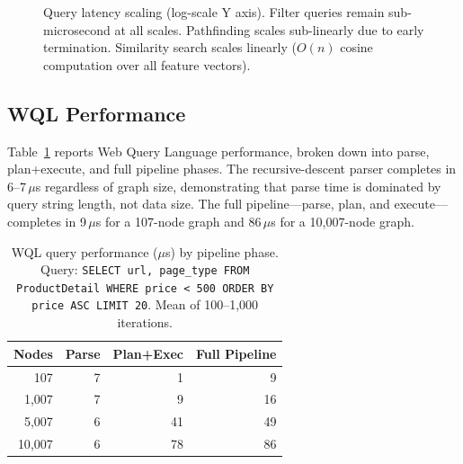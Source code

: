 \documentclass[10pt, twocolumn]{article}
\begin{document}
\begin{figure}[t]
\centering
{}
\caption{Query latency scaling (log-scale Y axis). Filter queries remain sub-microsecond at all scales. Pathfinding scales sub-linearly due to early termination. Similarity search scales linearly ($O(n)$ cosine computation over all feature vectors).}
\label{fig:querylatency}
\end{figure}

\subsection{WQL Performance}
\label{sec:wqleval}

Table~\ref{tab:wql} reports Web Query Language performance, broken down into parse, plan+execute, and full pipeline phases. The recursive-descent parser completes in 6--7\,$\mu$s regardless of graph size, demonstrating that parse time is dominated by query string length, not data size. The full pipeline---parse, plan, and execute---completes in 9\,$\mu$s for a 107-node graph and 86\,$\mu$s for a 10{,}007-node graph.

\begin{table}[t]
\caption{WQL query performance ($\mu$s) by pipeline phase. Query: \texttt{SELECT url, page\_type FROM ProductDetail WHERE price < 500 ORDER BY price ASC LIMIT 20}. Mean of 100--1{,}000 iterations.}
\label{tab:wql}
\centering
\small
\begin{tabular}{@{}rrrr@{}}
\toprule
\textbf{Nodes} & \textbf{Parse} & \textbf{Plan+Exec} & \textbf{Full Pipeline} \\
\midrule
107 & 7 & 1 & 9 \\
1{,}007 & 7 & 9 & 16 \\
5{,}007 & 6 & 41 & 49 \\
10{,}007 & 6 & 78 & 86 \\
\bottomrule
\end{tabular}
\end{table}
\end{document}
